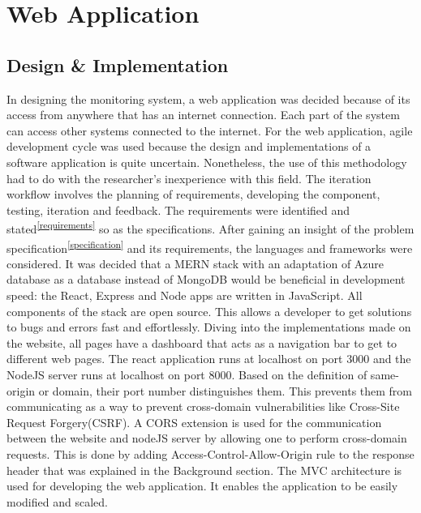 \section{Web Application}
\subsection*{Design \& Implementation}
In designing the monitoring system, a web application was decided because of its access from anywhere that has an internet connection. Each part of the system can access other systems connected to the internet.
For the web application, agile development cycle was used because the design and implementations of a software application is quite uncertain. Nonetheless, the use of this methodology had to do with the researcher's inexperience with this field. The iteration workflow involves the planning of requirements, developing the component, testing, iteration and feedback. The requirements were identified and stated\textsuperscript{\ref{requirements}} so as the specifications. After gaining an insight of the problem specification\textsuperscript{\ref{specification}} and its requirements, the languages and frameworks were considered. It was decided that a \gls{MERN} stack with an adaptation of Azure database as a database instead of MongoDB would be beneficial in development speed: the React, Express and Node apps are written in JavaScript. All components of the stack are open source. This allows a developer to get solutions to bugs and errors fast and effortlessly. Diving into the implementations made on the website, all pages have a dashboard that acts as a navigation bar to get to different web pages. The react application runs at localhost on port 3000 and the NodeJS server runs at localhost on port 8000. Based on the definition of same-origin or domain, their port number distinguishes them. This prevents them from communicating as a way to prevent cross-domain vulnerabilities like Cross-Site Request Forgery(CSRF). A \gls{CORS} extension is used for the communication between the website and nodeJS server by allowing one to perform cross-domain requests. This is done by adding Access-Control-Allow-Origin rule to the response header that was explained in the Background section. The \gls{MVC} architecture is used for developing the web application. It enables the application to be easily modified and scaled.
 
